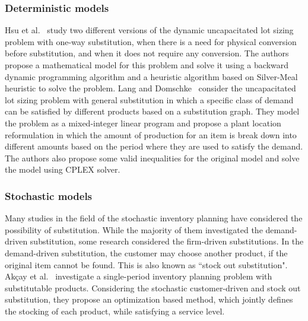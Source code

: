 \documentclass[10pt]{article}
\begin{document}
\subsubsection{Deterministic models}
 Hsu et al.~\cite{hsu2005dynamic} study two different versions of the dynamic uncapacitated lot sizing problem with one-way substitution, when there is a need for physical conversion before substitution, and when it does not require any conversion. The authors propose a mathematical model for this problem and solve it using a backward dynamic programming algorithm and a heuristic algorithm based on Silver-Meal heuristic to solve the problem.  Lang and Domschke~\cite{lang2010efficient} consider the uncapacitated lot sizing problem with general substitution in which a specific class of demand can be satisfied by different products based on a substitution graph. They model the problem as a mixed-integer linear program and propose a plant location reformulation in which the amount of production for an item is break down into different amounts based on the period where they are used to satisfy the demand. The authors also propose some valid inequalities for the original model and solve the model using CPLEX solver.
\subsubsection{Stochastic models}
Many studies in the field of the stochastic inventory planning have considered the possibility of substitution. While the majority of them investigated the demand-driven substitution, some research considered the firm-driven substitutions.
In the demand-driven substitution, the customer may choose another product, if the original item cannot be found. This is also known as ``stock out substitution". Akçay et al.~\cite{akccaycategory} investigate a single-period inventory planning problem with substitutable products. Considering the stochastic customer-driven and stock out  substitution, they propose an optimization based method, which jointly defines the stocking of each product, while satisfying a service level. 
\end{document}
